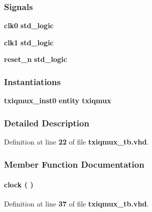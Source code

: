 \subsubsection*{Signals}
 \begin{DoxyCompactItemize}
\item 
{\bf clk0} {\bfseries \textcolor{comment}{std\+\_\+logic}\textcolor{vhdlchar}{ }} 
\item 
{\bf clk1} {\bfseries \textcolor{comment}{std\+\_\+logic}\textcolor{vhdlchar}{ }} 
\item 
{\bf reset\+\_\+n} {\bfseries \textcolor{comment}{std\+\_\+logic}\textcolor{vhdlchar}{ }} 
\end{DoxyCompactItemize}
\subsubsection*{Instantiations}
 \begin{DoxyCompactItemize}
\item 
{\bf txiqmux\+\_\+inst0}  {\bfseries entity txiqmux}   
\end{DoxyCompactItemize}


\subsubsection{Detailed Description}


Definition at line {\bf 22} of file {\bf txiqmux\+\_\+tb.\+vhd}.



\subsubsection{Member Function Documentation}
\paragraph[{clock}]{\setlength{\rightskip}{0pt plus 5cm} {\bfseries \textcolor{vhdlchar}{ }} clock ( ) \hspace{0.3cm}{\ttfamily [Process]}}\label{classtxiqmux__tb_1_1tb__behave_af761a67e9d7ce9e23381088b6f2ae893}


Definition at line {\bf 37} of file {\bf txiqmux\+\_\+tb.\+vhd}.

